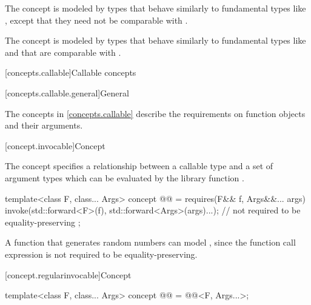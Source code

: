 \begin{itemdescr}
\pnum
\begin{note}
The  concept is modeled by types that behave similarly
to fundamental types like , except that they need not
be comparable with \tcode{==}.
\end{note}

\pnum
\begin{note}
The  concept is modeled by types that behave similarly to
fundamental types like  and that are comparable with
\tcode{==}.
\end{note}
\end{itemdescr}

[concepts.callable]{Callable concepts}

[concepts.callable.general]{General}

\pnum
The concepts in \ref{concepts.callable} describe the requirements on function
objects and their arguments.

[concept.invocable]{Concept }

\pnum
The  concept specifies a relationship between a callable
type  and a set of argument types  which
can be evaluated by the library function .

\begin{itemdecl}
template<class F, class... Args>
  concept @@ = requires(F&& f, Args&&... args) {
    invoke(std::forward<F>(f), std::forward<Args>(args)...); // not required to be equality-preserving
  };
\end{itemdecl}

\begin{itemdescr}
\pnum
\begin{example}
A function that generates random numbers can model ,
since the  function call expression is not required to be
equality-preserving.
\end{example}
\end{itemdescr}

[concept.regularinvocable]{Concept }

\begin{itemdecl}
template<class F, class... Args>
  concept @@ = @@<F, Args...>;
\end{itemdecl}

